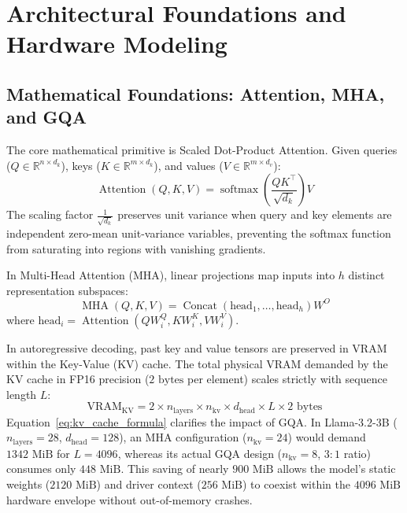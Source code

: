 \documentclass[10pt,a4paper,twocolumn]{article}
\begin{document}
\section{Architectural Foundations and Hardware Modeling}

\subsection{Mathematical Foundations: Attention, MHA, and GQA}

The core mathematical primitive is Scaled Dot-Product Attention. Given queries ($Q \in \mathbb{R}^{n \times d_k}$), keys ($K \in \mathbb{R}^{m \times d_k}$), and values ($V \in \mathbb{R}^{m \times d_v}$):
\begin{equation}
\operatorname{Attention}(Q,K,V) = \operatorname{softmax}\left(\frac{QK^\top}{\sqrt{d_k}}\right)V
\label{eq:scaled_dot_product}
\end{equation}
The scaling factor $\frac{1}{\sqrt{d_k}}$ preserves unit variance when query and key elements are independent zero-mean unit-variance variables, preventing the softmax function from saturating into regions with vanishing gradients.

In Multi-Head Attention (MHA), linear projections map inputs into $h$ distinct representation subspaces:
\begin{equation}
\operatorname{MHA}(Q,K,V) = \operatorname{Concat}(\text{head}_1, \dots, \text{head}_h)W^O
\end{equation}
where $\text{head}_i = \operatorname{Attention}(QW_i^Q, KW_i^K, VW_i^V)$.

In autoregressive decoding, past key and value tensors are preserved in VRAM within the Key-Value (KV) cache. The total physical VRAM demanded by the KV cache in FP16 precision ($2\text{ bytes}$ per element) scales strictly with sequence length $L$:
\begin{equation}
\text{VRAM}_{\text{KV}} = 2 \times n_{\text{layers}} \times n_{\text{kv}} \times d_{\text{head}} \times L \times 2\text{ bytes}
\label{eq:kv_cache_formula}
\end{equation}
Equation~\eqref{eq:kv_cache_formula} clarifies the impact of GQA. In Llama-3.2-3B ($n_{\text{layers}} = 28$, $d_{\text{head}} = 128$), an MHA configuration ($n_{\text{kv}} = 24$) would demand $1342\text{ MiB}$ for $L = 4096$, whereas its actual GQA design ($n_{\text{kv}} = 8$, $3:1$ ratio) consumes only $448\text{ MiB}$. This saving of nearly $900\text{ MiB}$ allows the model's static weights ($2120\text{ MiB}$) and driver context ($256\text{ MiB}$) to coexist within the $4096\text{ MiB}$ hardware envelope without out-of-memory crashes.
\end{document}
